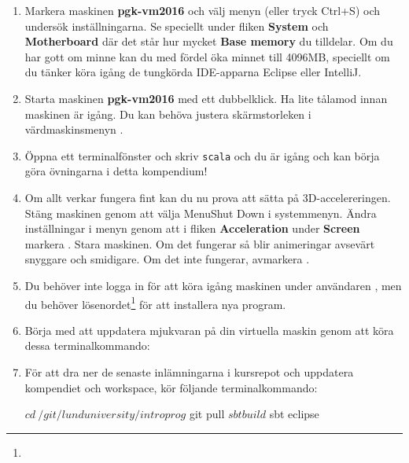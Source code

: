 \begin{enumerate}
\item Markera maskinen \textbf{pgk-vm2016} och välj menyn  (eller tryck Ctrl+S) och undersök inställningarna. Se speciellt under fliken \textbf{System} och \textbf{Motherboard} där det står hur mycket \textbf{Base memory} du tilldelar. Om du har gott om minne kan du med fördel öka minnet till 4096MB, speciellt om du tänker köra igång de tungkörda IDE-apparna Eclipse eller IntelliJ.

\item Starta maskinen \textbf{pgk-vm2016} med ett dubbelklick. Ha lite tålamod innan maskinen är igång. Du kan behöva justera skärmstorleken i värdmaskinsmenyn .

\item Öppna ett terminalfönster och skriv \texttt{scala} och du är igång och kan börja göra övningarna i detta kompendium!

\item Om allt verkar fungera fint kan du nu prova att sätta på 3D-accelereringen. Stäng maskinen genom att välja Menu{Shut Down} i systemmenyn. Ändra inställningar i menyn  genom att i fliken \textbf{Acceleration} under \textbf{Screen} markera . Stara maskinen. Om det fungerar så blir animeringar avsevärt snyggare och smidigare. Om det inte fungerar, avmarkera .

\item Du behöver inte logga in för att köra igång maskinen under användaren , men du  behöver lösenordet\footnote{} för att installera nya program.

\item Börja med att uppdatera mjukvaran på din virtuella maskin genom att köra dessa terminalkommando:


\item För att dra ner de senaste inlämningarna i kursrepot och uppdatera kompendiet och workspace, kör följande terminalkommando:
\begin{REPLnonum}
$ cd ~/git/lunduniversity/introprog
$ git pull
$ sbt build
$ sbt eclipse
\end{REPLnonum}

\end{enumerate}

